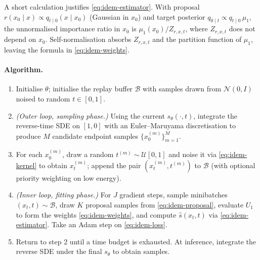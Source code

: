 \documentclass[11pt,letterpaper]{article}
\theoremstyle{plain}
\begin{document}
A short calculation justifies \eqref{eq:idem-estimator}. With proposal
$r(x_0\mid x)\propto q_{t\mid 0}(x\mid x_0)$ (Gaussian in $x_0$) and target
posterior $q_{0\mid t}\propto q_{t\mid 0}\,\mu_1$, the unnormalised importance
ratio in $x_0$ is $\mu_1(x_0)/Z_{r,x,t}$, where $Z_{r,x,t}$ does not depend on
$x_0$. Self-normalisation absorbs $Z_{r,x,t}$ and the partition function of
$\mu_1$, leaving the formula in \eqref{eq:idem-weights}.

\paragraph{Algorithm.}
\begin{enumerate}\setlength{\itemsep}{1pt}
  \item Initialise $\theta$; initialise the replay buffer $\mathcal B$ with
    samples drawn from $\mathcal N(0,I)$ noised to random $t\in[0,1]$.
  \item \emph{(Outer loop, sampling phase.)} Using the current
    $s_\theta(\cdot,t)$, integrate the reverse-time SDE on $[1,0]$ with an
    Euler--Maruyama discretisation to produce $M$ candidate endpoint samples
    $\{x_0^{(m)}\}_{m=1}^{M}$.
  \item For each $x_0^{(m)}$, draw a random $t^{(m)}\sim\mathcal U[0,1]$ and
    noise it via \eqref{eq:idem-kernel} to obtain $x_t^{(m)}$; append the pair
    $(x_t^{(m)},t^{(m)})$ to $\mathcal B$ (with optional priority weighting on
    low energy).
  \item \emph{(Inner loop, fitting phase.)} For $J$ gradient steps, sample
    minibatches $(x_t,t)\sim\mathcal B$, draw $K$ proposal samples from
    \eqref{eq:idem-proposal}, evaluate $U_1$ to form the weights
    \eqref{eq:idem-weights}, and compute $\widehat s(x_t,t)$ via
    \eqref{eq:idem-estimator}. Take an Adam step on \eqref{eq:idem-loss}.
  \item Return to step 2 until a time budget is exhausted. At inference,
    integrate the reverse SDE under the final $s_\theta$ to obtain samples.
\end{enumerate}
\end{document}
